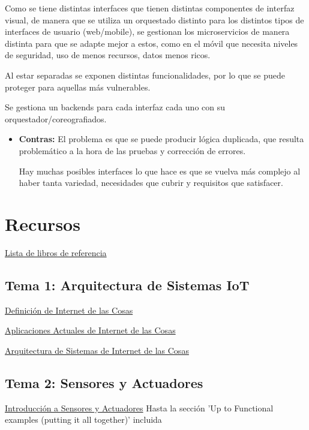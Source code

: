 \documentclass[12pt]{report} %
\begin{document}
Como se tiene distintas interfaces que tienen distintas componentes de interfaz visual, de manera que se utiliza un orquestado distinto para los distintos tipos de interfaces de usuario (web/mobile), se gestionan los microservicios de manera distinta para que se adapte mejor a estos, como en el móvil que necesita niveles de seguridad, uso de menos recursos, datos menos ricos.

Al estar separadas se exponen distintas funcionalidades, por lo que se puede proteger para aquellas más vulnerables.

Se gestiona un backends para cada interfaz cada uno con su orquestador/coreografiados.

\begin{itemize}
	\item \textbf{Contras:} El problema es que se puede producir lógica duplicada, que resulta problemático a la hora de las pruebas y corrección de errores.

	Hay muchas posibles interfaces lo que hace es que se vuelva más complejo al haber tanta variedad, necesidades que cubrir y requisitos que satisfacer.
\end{itemize}	
	
	
	
\chapter{Recursos}
\href{https://learning.oreilly.com/playlists/5a6c045f-e39c-465e-9e7c-60dcbb12aebb}{Lista de libros de referencia}

\section{Tema 1: Arquitectura de Sistemas IoT}
\href{https://learning.oreilly.com/library/view/internet-of-things/9781788470599/a7f866bd-4ac8-47f3-a175-0f10d91a5ce2.xhtml}{Definición de Internet de las Cosas}

\href{https://learning.oreilly.com/library/view/internet-of-things/9781119456742/part04.xhtml\#part}{Aplicaciones Actuales de Internet de las Cosas}

\href{https://learning.oreilly.com/library/view/build-your-own/9781484244982/html/474034_1_En_2_Chapter.xhtml}{Arquitectura de Sistemas de Internet de las Cosas}

\section{Tema 2: Sensores y Actuadores}
\href{https://learning.oreilly.com/library/view/internet-of-things/9781788470599/d39be056-b166-476e-868e-c415e4dfa886.xhtml}{Introducción a Sensores y Actuadores} Hasta la sección 'Up to Functional examples (putting it all together)' incluida
\end{document}
